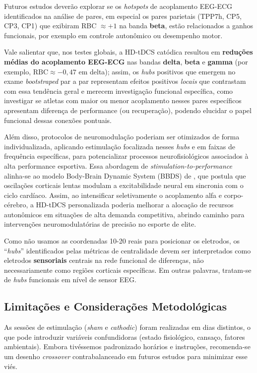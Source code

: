 Futuros estudos deverão explorar se os \textit{hotspots} de acoplamento EEG-ECG identificados na análise de pares, em especial os pares parietais (TPP7h, CP5, CP3, CP1) que exibiram RBC $\approx +1$ na banda \textbf{beta}, estão relacionados a ganhos funcionais, por exemplo em controle autonômico ou desempenho motor. 

Vale salientar que, nos testes globais, a HD-tDCS catódica resultou em \textbf{reduções médias do acoplamento EEG-ECG} nas bandas \textbf{delta}, \textbf{beta} e \textbf{gamma} (por exemplo, \(\mathrm{RBC}\approx -0{,}47\) em delta); assim, os \textit{hubs} positivos que emergem no exame \textit{bootstraped} par a par representam efeitos positivos \textit{locais} que contrastam com essa tendência geral e merecem investigação funcional específica, como investigar se atletas com maior ou menor acoplamento nesses pares específicos apresentam diferença de performance (ou recuperação), podendo elucidar o papel funcional dessas conexões pontuais.

Além disso, protocolos de neuromodulação poderiam ser otimizados de forma individualizada, aplicando estimulação focalizada nesses \textit{hubs} e em faixas de frequência específicas, para potencializar processos neurofisiológicos associados à alta performance esportiva. Essa abordagem de \textit{stimulation-to-performance} alinha-se ao modelo Body-Brain Dynamic System (BBDS) de , que postula que oscilações corticais lentas modulam a excitabilidade neural em sincronia com o ciclo cardíaco. Assim, ao intensificar seletivamente o acoplamento alfa e corpo-cérebro, a HD-tDCS personalizada poderia melhorar a alocação de recursos autonômicos em situações de alta demanda competitiva, abrindo caminho para intervenções neuromodulatórias de precisão no esporte de elite.

Como não usamos as coordenadas 10-20 reais para posicionar os eletrodos, os ``\textit{hubs}'' identificados pelas métricas de centralidade devem ser interpretados como eletrodos \textbf{sensoriais} centrais na rede funcional de diferenças, não necessariamente como regiões corticais específicas. Em outras palavras, tratam-se de \textit{hubs} funcionais em nível de sensor EEG.

\subsection{Limitações e Considerações Metodológicas}
As sessões de estimulação (\textit{sham} e \textit{cathodic}) foram realizadas em dias distintos, o que pode introduzir variáveis confundidoras (estado fisiológico, cansaço, fatores ambientais). Embora tivéssemos padronizado horários e instruções, recomenda-se um desenho \textit{crossover} contrabalanceado em futuros estudos para minimizar esse viés.

